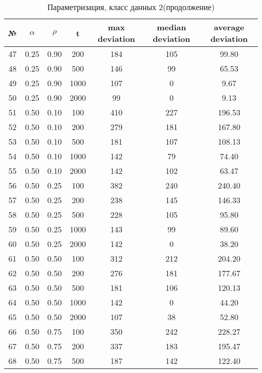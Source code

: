 \documentclass[a4paper, 12pt, unknownkeysallowed]{extreport}
\begin{document}
\begin{center}
  \captionsetup{justification=raggedright,singlelinecheck=off}
  \begin{longtable}[c]{|c|c|c|c|c|c|c|}
  \caption{Параметризация, класс данных 2(продолжение)\label{tbl:p_2_2}} \\ \hline
  № & $\alpha$ & $\rho$ & t & max deviation & median deviation & average deviation \\ \hline   
  47 & 0.25 & 0.90 &   200 &  184 &  105 & 99.80 \\ \hline
  48 & 0.25 & 0.90 &   500 &  146 &   99 & 65.53 \\ \hline
  49 & 0.25 & 0.90 &  1000 &  107 &    0 &  9.67 \\ \hline
  50 & 0.25 & 0.90 &  2000 &   99 &    0 &  9.13 \\ \hline
  51 & 0.50 & 0.10 &   100 &  410 &  227 & 196.53 \\ \hline
  52 & 0.50 & 0.10 &   200 &  279 &  181 & 167.80 \\ \hline
  53 & 0.50 & 0.10 &   500 &  181 &  107 & 108.13 \\ \hline
  54 & 0.50 & 0.10 &  1000 &  142 &   79 & 74.40 \\ \hline
  55 & 0.50 & 0.10 &  2000 &  142 &  102 & 63.47 \\ \hline
  56 & 0.50 & 0.25 &   100 &  382 &  240 & 240.40 \\ \hline
  57 & 0.50 & 0.25 &   200 &  238 &  145 & 146.33 \\ \hline
  58 & 0.50 & 0.25 &   500 &  228 &  105 & 95.80 \\ \hline
  59 & 0.50 & 0.25 &  1000 &  143 &   99 & 89.60 \\ \hline
  60 & 0.50 & 0.25 &  2000 &  142 &    0 & 38.20 \\ \hline
  61 & 0.50 & 0.50 &   100 &  312 &  212 & 204.20 \\ \hline
  62 & 0.50 & 0.50 &   200 &  276 &  181 & 177.67 \\ \hline
  63 & 0.50 & 0.50 &   500 &  181 &  106 & 120.13 \\ \hline
  64 & 0.50 & 0.50 &  1000 &  142 &    0 & 44.20 \\ \hline
  65 & 0.50 & 0.50 &  2000 &  107 &   38 & 52.80 \\ \hline
  66 & 0.50 & 0.75 &   100 &  350 &  242 & 228.27 \\ \hline
  67 & 0.50 & 0.75 &   200 &  337 &  183 & 195.47 \\ \hline
  68 & 0.50 & 0.75 &   500 &  187 &  142 & 122.40 \\ \hline

\end{longtable}
\end{center}
\end{document}
